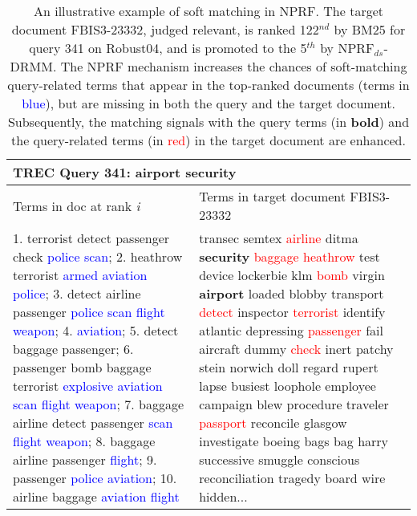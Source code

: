 \documentclass[11pt,a4paper]{article}
\begin{document}
\begin{table*}[tbh]
	\centering\small
	\begin{tabularx}{\textwidth}{|p{7.5cm}|X|}
		\hline
		\multicolumn{2}{|l|}{TREC Query 341: airport security}\\ \hline
		Terms in doc at rank {\em i} & Terms in target document FBIS3-23332 \\
		\hline
		1. terrorist detect passenger check \textcolor{blue}{police} \textcolor{blue}{scan};
2. heathrow  terrorist \textcolor{blue}{armed} \textcolor{blue}{aviation} \textcolor{blue}{police};
3. detect airline passenger \textcolor{blue}{police} \textcolor{blue}{scan} \textcolor{blue}{flight} \textcolor{blue}{weapon}; 4. \textcolor{blue}{aviation}; 5. detect baggage  passenger; 6. passenger bomb baggage  terrorist \textcolor{blue}{explosive} \textcolor{blue}{aviation} \textcolor{blue}{scan} \textcolor{blue}{flight} \textcolor{blue}{weapon}; 7. baggage airline detect passenger \textcolor{blue}{scan} \textcolor{blue}{flight}  \textcolor{blue}{weapon}; 8. baggage  airline passenger \textcolor{blue}{flight}; 9. passenger \textcolor{blue}{police} \textcolor{blue}{aviation}; 10. airline baggage \textcolor{blue}{aviation} \textcolor{blue}{flight}
		& transec semtex \textcolor{red}{airline} ditma {\bf security} \textcolor{red}{baggage} \textcolor{red}{heathrow} test device lockerbie klm \textcolor{red}{bomb} virgin {\bf airport} loaded blobby transport \textcolor{red}{detect} inspector \textcolor{red}{terrorist} identify atlantic depressing \textcolor{red}{passenger} fail aircraft dummy \textcolor{red}{check} inert patchy stein norwich doll regard rupert lapse busiest loophole employee campaign blew procedure traveler \textcolor{red}{passport} reconcile glasgow investigate boeing bags bag harry successive smuggle conscious reconciliation tragedy board wire hidden...\\
\hline
	\end{tabularx}
	\caption{\small An illustrative example of soft matching in NPRF. The target document FBIS3-23332, judged relevant, is ranked 122$^{nd}$ by BM25 for query 341 on Robust04, and is promoted to the 5$^{th}$ by NPRF$_{ds}$-DRMM. The NPRF mechanism increases the chances of soft-matching query-related terms that appear in the top-ranked documents (terms in \textcolor{blue}{blue}), but are missing in both the query and the target document. Subsequently, the matching signals with the query terms (in {\bf bold}) and the query-related terms (in \textcolor{red}{red}) in the target document are enhanced.
	}\label{tab.example}
\end{table*}
\end{document}
